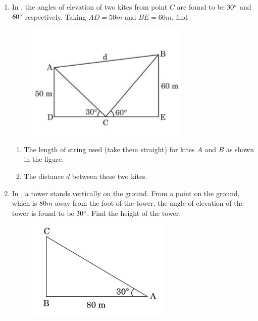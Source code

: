 \begin{enumerate}[label=\thesubsection.\arabic*.,ref=\thesubsection.\theenumi]
\item In , the angles of elevation of two kites from point $C$ are found to be ${30}\degree$ and  ${60}\degree$ respectively. Taking $AD = 50m $  and $ BE = 60m$,
find
    \begin{figure}[H]
        \centering
        \includegraphics[width=\columnwidth]{cbse/figs/kites.jpeg}
        \caption{}
        \label{fig:kites5}
    \end{figure}
\begin{enumerate}
\item The length of string used (take them straight) for kites $A$ and $B$ as shown in the figure.
\item The distance $d$ between these two kites.
\end{enumerate}
\hfill{}
\item In  , a tower stands vertically on the ground. From a point on the ground, which is $80m$ away from the foot of the tower, the angle of elevation of the tower is found to be $30\degree$. Find the height of the tower.
    \begin{figure}[H]
        \centering
        \includegraphics[width=\columnwidth]{cbse/figs/as.jpeg}

\end{figure}
\end{enumerate}
